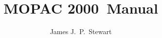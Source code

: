 \def\mopacversion{2000}
\title{MOPAC \mopacversion\ Manual}
\author{James J.\ P.\ Stewart}
\pagestyle{headings}
%


%
%
%







%
\appendix







\printindex{}{}

%
